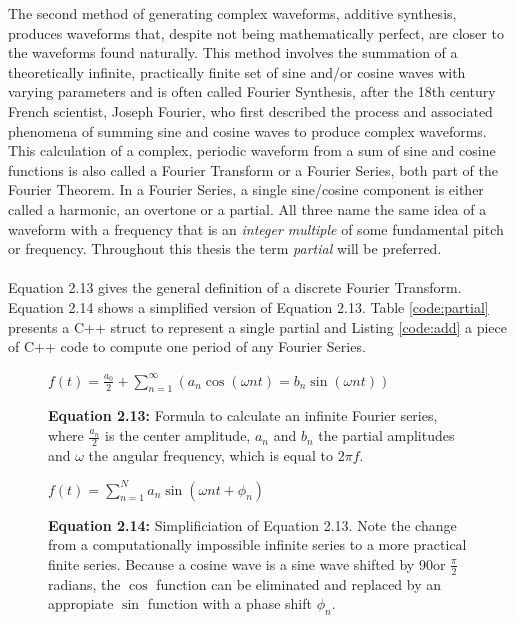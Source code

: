 \documentclass[12pt,twoside]{report}
\begin{document}
The second method of generating complex waveforms, additive synthesis, produces waveforms that, despite not being mathematically perfect, are closer to the waveforms found naturally. This method involves the summation of a theoretically infinite, practically finite set of sine and/or cosine waves with varying parameters and is often called Fourier Synthesis, after the 18th century French scientist, Joseph Fourier, who first described the process and associated phenomena of summing sine and cosine waves to produce complex waveforms. This calculation of a complex, periodic waveform from a sum of sine and cosine functions is also called a Fourier Transform or a Fourier Series, both part of the Fourier Theorem. In a Fourier Series, a single sine/cosine component is either called a harmonic, an overtone or a partial. All three name the same idea of a waveform with a frequency that is an \emph{integer multiple} of some fundamental pitch or frequency.  Throughout this thesis the term \emph{partial} will be preferred. \\\\Equation 2.13 gives the general definition of a discrete Fourier Transform. Equation 2.14 shows a simplified version of Equation 2.13. Table \ref{code:partial} presents a C++ struct to represent a single partial and Listing \ref{code:add} a piece of C++ code to compute one period of any Fourier Series.

\begin{figure}[h!]
  $f(t) = \frac{a_{0}}{2} + \sum\limits_{n=1}^\infty (a_{n} \cos(\omega n t) = b_{n} \sin(\omega n t))$
  \caption*{\textbf{Equation 2.13: }Formula to calculate an infinite Fourier series, where $\frac{a_{n}}{2}$ is the center amplitude, $a_{n}$ and $b_{n}$ the partial amplitudes and $\omega$ the angular frequency, which is equal to $2 \pi f$.}
  \label{fig:fourier1}
\end{figure}

\begin{figure}[h!]
  $f(t) = \sum\limits_{n=1}^N a_{n} \sin(\omega n t + \phi_{n})$
  \caption*{\textbf{Equation 2.14:} Simplificiation of Equation 2.13. Note the change from a computationally impossible infinite series to a more practical finite series. Because a cosine wave is a sine wave shifted by 90\degree or $\frac{\pi}{2}$ radians, the $\cos$ function can be eliminated and replaced by an appropiate $\sin$ function with a phase shift $\phi_{n}$.}
  \label{fig:fourier2}
\end{figure}
\end{document}
